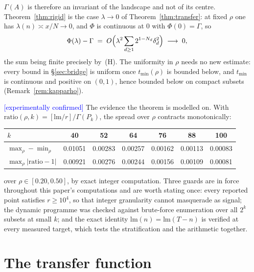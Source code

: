 \documentclass[11pt,a4paper]{article}
\theoremstyle{plain}
\theoremstyle{definition}
\theoremstyle{remark}
\newcommand{\lm}{\mathrm{lm}}
\newcommand{\STATUS}[1]{\textcolor{blue}{\textsf{[#1]}}}
\begin{document}
\noindent
$\Gamma(A)$ is therefore an invariant of the landscape and not of its centre.
Theorem~\ref{thm:rigid} is the case $\lambda\to0$ of Theorem~\ref{thm:transfer}: at fixed $\rho$
one has $\lambda(n)\asymp x/N\to0$, and $\Phi$ is continuous at $0$ with $\Phi(0)=\Gamma$, so
\[
  \Phi(\lambda)-\Gamma\;=\;O\Bigl(\lambda^{2}\sum_{d\ge1}2^{1-N_d}\delta_d^{2}\Bigr)
  \;\longrightarrow\;0,
\]
the sum being finite precisely by~(H). The uniformity in $\rho$ needs no new estimate: every
bound in \S\ref{sec:bridge} is uniform once $t_{\min}(\rho)$ is bounded below, and
$t_{\min}$ is continuous and positive on $(0,1)$, hence bounded below on compact subsets
(Remark~\ref{rem:kapparho}).

\STATUS{experimentally confirmed} The evidence the theorem is modelled on. With
$\mathrm{ratio}(\rho,k)=[\lm/r]/\Gamma(P_k)$, the spread over $\rho$ contracts monotonically:

\begin{center}
\begin{tabular}{lcccccc}
\toprule
$k$ & 40 & 52 & 64 & 76 & 88 & 100\\
\midrule
$\max_\rho-\min_\rho$ & 0.01051 & 0.00283 & 0.00257 & 0.00162 & 0.00113 & 0.00083\\
$\max_\rho|\mathrm{ratio}-1|$ & 0.00921 & 0.00276 & 0.00244 & 0.00156 & 0.00109 & 0.00081\\
\bottomrule
\end{tabular}
\end{center}

\noindent
over $\rho\in[0.20,0.50]$, by exact integer computation. Three guards are in force throughout
this paper's computations and are worth stating once: every reported point satisfies
$r\ge10^{4}$, so that integer granularity cannot masquerade as signal; the dynamic
programme was checked against brute-force enumeration over all $2^{k}$ subsets at small $k$;
and the exact identity $\lm(n)=\lm(T-n)$ is verified at every measured target, which tests the
stratification and the arithmetic together.

\section{The transfer function}\label{sec:transfer}
\end{document}
